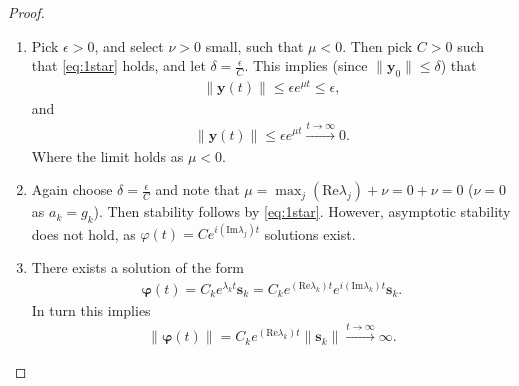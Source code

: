 \begin{proof}
	\begin{enumerate}
		\item Pick $\epsilon > 0$, and select $\nu > 0$ small, such that $\mu <0$. Then pick $C> 0$ such that \eqref{eq:1star} holds, and let $\delta = \frac{\epsilon}{C}$. This implies (since $\| \bm{y} _0\| \leq \delta $) that
			\begin{align}
				\| \bm{y} (t) \| \leq \epsilon e^{\mu t} \leq \epsilon,
			\end{align}
		and
		\begin{align}
			\| \bm{y} (t) \| \leq \epsilon e^{\mu t} \xrightarrow{t \to \infty } 0. 
		\end{align}
	Where the limit holds as $\mu < 0$.	
\item Again choose $\delta = \frac{\epsilon}{C}$ and note that $\mu  = \max_{j} ( \textrm{Re} \lambda _j) + \nu = 0 + \nu =0$ ($\nu =0$ as $a_k = g_k$). Then stability follows by \eqref{eq:1star}. However, asymptotic stability does not hold, as $\varphi(t) = C e^{i ( \textrm{Im} \lambda _j)t} $ solutions exist.

\item There exists a solution of the form
	\begin{align}
		\bm{	\varphi}(t) = C_k e^{\lambda _k t} \bm{s} _k = C_k e^{( \textrm{Re}  \lambda _k)t} e ^{i ( \textrm{Im} \lambda _k)t}\bm{s} _k.
	\end{align}
In turn this implies
\begin{align}
	\| \bm{\varphi}(t) \| = C_k e^{( \textrm{Re} \lambda_k) t} \| \bm{s} _k \| \xrightarrow{t \to \infty} \infty .
\end{align}

	\end{enumerate}
\end{proof}
